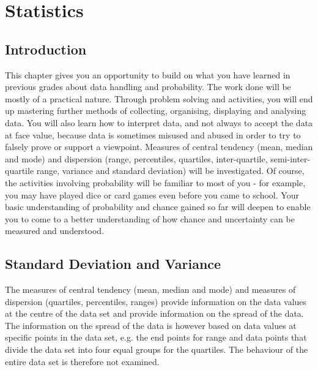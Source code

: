 \chapter{Statistics}
\label{m:s11}

\section{Introduction}
This chapter gives you an opportunity to build on what you have learned in previous grades about data handling and probability. The work done will be mostly  of a practical nature. Through problem solving and activities, you will end up mastering further methods of collecting, organising, displaying and analysing data. You will also learn how to interpret data, and not always to accept the data at face value, because data is sometimes misused and abused in order to try to falsely prove or support a viewpoint. Measures of central tendency (mean, median and mode) and dispersion (range, percentiles, quartiles, inter-quartile, semi-inter-quartile range, variance and standard deviation) will be investigated. Of course, the activities involving probability will be familiar to most of you - for example, you may have played dice or card games even before you came to school. Your basic understanding of probability and chance gained so far will deepen to enable you to come to a better understanding of how chance and uncertainty can be measured and understood.  

\section{Standard Deviation and Variance}

The measures of central tendency (mean, median and mode) and measures of dispersion (quartiles, percentiles, ranges) provide information on the data values at the centre of the data set and provide information on the spread of the data. The information on the spread of the data is however based on data values at specific points in the data set, e.g. the end points for range and data points that divide the data set into four equal groups for the quartiles. The behaviour of the entire data set is therefore not examined.

